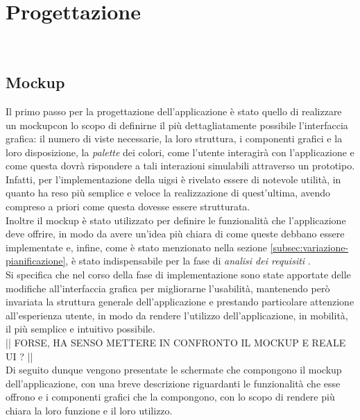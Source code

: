 \chapter{Progettazione}
\label{cap:progettazione}

\\

\section{Mockup}
\label{sec:mockup}

Il primo passo per la progettazione dell'applicazione è stato quello di realizzare un \gls{mockup}\glsoccur con lo scopo di definirne il più dettagliatamente possibile l'interfaccia grafica: il numero di viste necessarie, la loro struttura, i componenti grafici e la loro disposizione, la \emph{palette} dei colori, come l'utente interagirà con l'applicazione e come questa dovrà rispondere a tali interazioni simulabili attraverso un prototipo. Infatti, per l'implementazione della \gls{uig}\glsoccur si è rivelato essere di notevole utilità, in quanto ha reso più semplice e veloce la realizzazione di quest'ultima, avendo compreso a priori come questa dovesse essere strutturata.\\
Inoltre il \gls{mockup} è stato utilizzato per definire le funzionalità che l'applicazione deve offrire, in modo da avere un'idea più chiara di come queste debbano essere implementate e, infine, come è stato menzionato nella sezione \ref{subsec:variazione-pianificazione}, è stato indispensabile per la fase di \emph{analisi dei requisiti} .\\ 
Si specifica che nel corso della fase di implementazione sono state apportate delle modifiche all'interfaccia grafica per migliorarne l'usabilità, mantenendo però invariata la struttura generale dell'applicazione e prestando particolare attenzione all'esperienza utente, in modo da rendere l'utilizzo dell'applicazione, in mobilità, il più semplice e intuitivo possibile.\\
|| FORSE, HA SENSO METTERE IN CONFRONTO IL MOCKUP E REALE UI ? ||\\
Di seguito dunque vengono presentate le schermate che compongono il mockup dell'applicazione, con una breve descrizione riguardanti le funzionalità che esse offrono e i componenti grafici che la compongono, con lo scopo di rendere più chiara la loro funzione e il loro utilizzo. 

